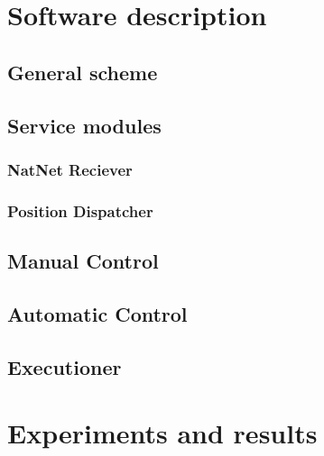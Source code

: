 \section{Software description}
\label{sec:sofdescrip}

\subsection{General scheme}
\subsection{Service modules}
\subsubsection{NatNet Reciever}
\subsubsection{Position Dispatcher}
\subsection{Manual Control}
\subsection{Automatic Control}
\label{sec:auto}
\subsection {Executioner}

\section{Experiments and results}